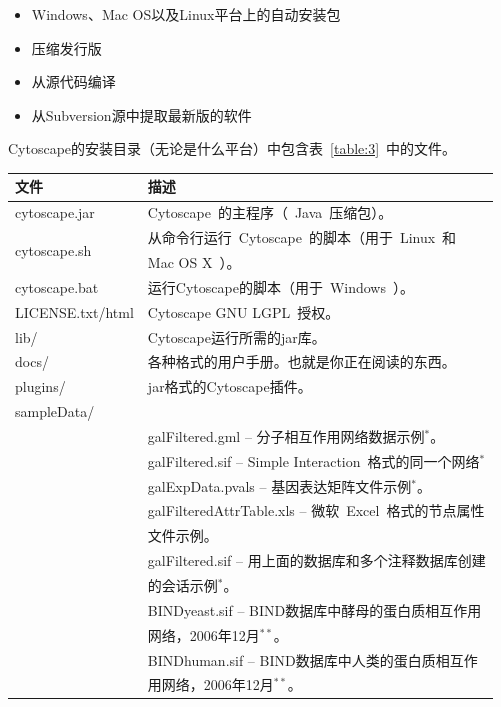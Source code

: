 		\begin{itemize}
		\item Windows、Mac OS以及Linux平台上的自动安装包
		\item 压缩发行版
		\item 从源代码编译
		\item 从Subversion源中提取最新版的软件
		\end{itemize}

		Cytoscape的安装目录（无论是什么平台）中包含表~\ref{table:3}~中的文件。

		\begin{table}[!h]
		\begin{tabular}{|l|l|}
			\hline
			文件 & 描述 \\
			\hline
			cytoscape.jar & Cytoscape~的主程序（~Java~压缩包）。\\
			\hline
			\multirow{2}{*}{cytoscape.sh} & 从命令行运行~Cytoscape~的脚本（用于~Linux~和~\\&Mac OS X~）。\\
			\hline
			cytoscape.bat & 运行Cytoscape的脚本（用于~Windows~）。\\
			\hline
			LICENSE.txt/html & Cytoscape GNU LGPL~授权。\\
			\hline
			lib/ & Cytoscape运行所需的jar库。\\
			\hline
			docs/ & 各种格式的用户手册。也就是你正在阅读的东西。\\
			\hline
			plugins/ & jar格式的Cytoscape插件。\\
			\hline
			sampleData/ & \\
			\hline
				& galFiltered.gml -- 分子相互作用网络数据示例$^*$。\\
			\hline
				& galFiltered.sif -- Simple Interaction~格式的同一个网络$^*$\\
			\hline
				& galExpData.pvals -- 基因表达矩阵文件示例$^*$。\\
			\hline
				\multirow{2}{*}{} & galFilteredAttrTable.xls -- 微软~Excel~格式的节点属性\\ & 文件示例。\\
			\hline
				\multirow{2}{*}{} & galFiltered.sif -- 用上面的数据库和多个注释数据库创建\\ & 的会话示例$^*$。\\
			\hline
				\multirow{2}{*}{} & BINDyeast.sif -- BIND数据库中酵母的蛋白质相互作用\\ & 网络，2006年12月$^{**}$。\\
			\hline
				\multirow{2}{*}{} & BINDhuman.sif -- BIND数据库中人类的蛋白质相互作\\ & 用网络，2006年12月$^{**}$。\\

\end{tabular}
\end{table}
